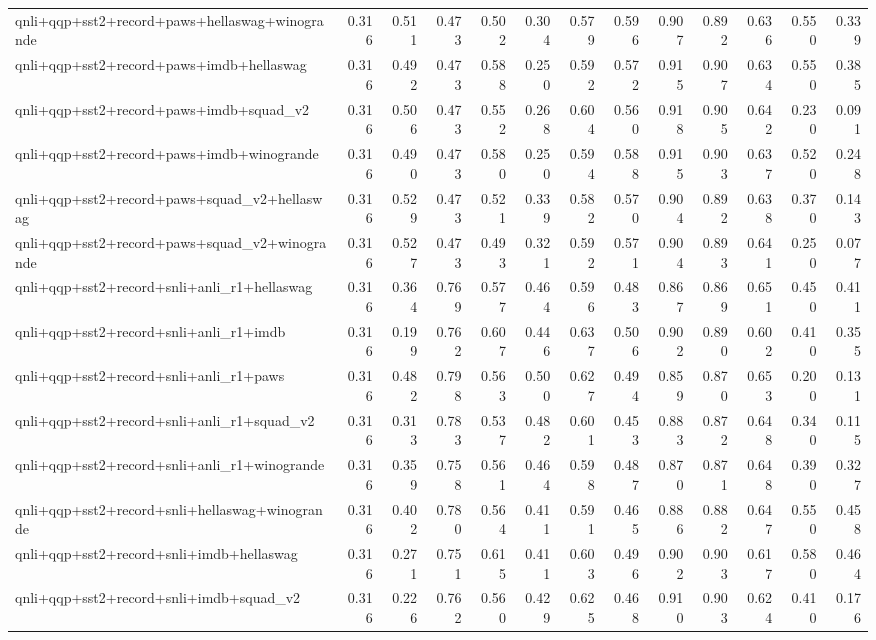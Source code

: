 \begin{table}[t]
\begin{tabular}{lrrrrrrrrrrrr}
    qnli+qqp+sst2+record+paws+hellaswag+winogrande & 0.316 & 0.511 & 0.473 & 0.502 & 0.304 & 0.579 & 0.596 & 0.907 & 0.892 & 0.636 & 0.550 & 0.339 \\
    qnli+qqp+sst2+record+paws+imdb+hellaswag & 0.316 & 0.492 & 0.473 & 0.588 & 0.250 & 0.592 & 0.572 & 0.915 & 0.907 & 0.634 & 0.550 & 0.385 \\
    qnli+qqp+sst2+record+paws+imdb+squad\_v2 & 0.316 & 0.506 & 0.473 & 0.552 & 0.268 & 0.604 & 0.560 & 0.918 & 0.905 & 0.642 & 0.230 & 0.091 \\
    qnli+qqp+sst2+record+paws+imdb+winogrande & 0.316 & 0.490 & 0.473 & 0.580 & 0.250 & 0.594 & 0.588 & 0.915 & 0.903 & 0.637 & 0.520 & 0.248 \\
    qnli+qqp+sst2+record+paws+squad\_v2+hellaswag & 0.316 & 0.529 & 0.473 & 0.521 & 0.339 & 0.582 & 0.570 & 0.904 & 0.892 & 0.638 & 0.370 & 0.143 \\
    qnli+qqp+sst2+record+paws+squad\_v2+winogrande & 0.316 & 0.527 & 0.473 & 0.493 & 0.321 & 0.592 & 0.571 & 0.904 & 0.893 & 0.641 & 0.250 & 0.077 \\
    qnli+qqp+sst2+record+snli+anli\_r1+hellaswag & 0.316 & 0.364 & 0.769 & 0.577 & 0.464 & 0.596 & 0.483 & 0.867 & 0.869 & 0.651 & 0.450 & 0.411 \\
    qnli+qqp+sst2+record+snli+anli\_r1+imdb & 0.316 & 0.199 & 0.762 & 0.607 & 0.446 & 0.637 & 0.506 & 0.902 & 0.890 & 0.602 & 0.410 & 0.355 \\
    qnli+qqp+sst2+record+snli+anli\_r1+paws & 0.316 & 0.482 & 0.798 & 0.563 & 0.500 & 0.627 & 0.494 & 0.859 & 0.870 & 0.653 & 0.200 & 0.131 \\
    qnli+qqp+sst2+record+snli+anli\_r1+squad\_v2 & 0.316 & 0.313 & 0.783 & 0.537 & 0.482 & 0.601 & 0.453 & 0.883 & 0.872 & 0.648 & 0.340 & 0.115 \\
    qnli+qqp+sst2+record+snli+anli\_r1+winogrande & 0.316 & 0.359 & 0.758 & 0.561 & 0.464 & 0.598 & 0.487 & 0.870 & 0.871 & 0.648 & 0.390 & 0.327 \\
    qnli+qqp+sst2+record+snli+hellaswag+winogrande & 0.316 & 0.402 & 0.780 & 0.564 & 0.411 & 0.591 & 0.465 & 0.886 & 0.882 & 0.647 & 0.550 & 0.458 \\
    qnli+qqp+sst2+record+snli+imdb+hellaswag & 0.316 & 0.271 & 0.751 & 0.615 & 0.411 & 0.603 & 0.496 & 0.902 & 0.903 & 0.617 & 0.580 & 0.464 \\
    qnli+qqp+sst2+record+snli+imdb+squad\_v2 & 0.316 & 0.226 & 0.762 & 0.560 & 0.429 & 0.625 & 0.468 & 0.910 & 0.903 & 0.624 & 0.410 & 0.176 \\

\end{tabular}
\end{table}
